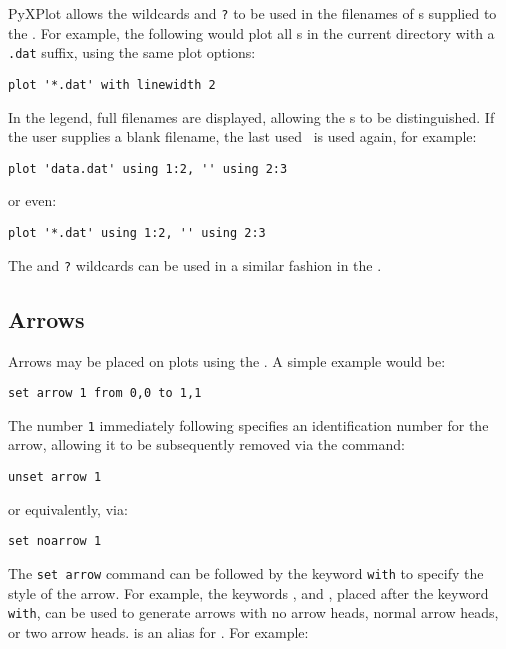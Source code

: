 PyXPlot allows the wildcards {\tt *} and {\tt ?} to be used in the filenames of
\datafile s supplied to the .  For example, the following would
plot all \datafile s in the current directory with a {\tt .dat} suffix, using
the same plot options:

\begin{verbatim}
plot '*.dat' with linewidth 2
\end{verbatim}

\noindent In the legend, full filenames are displayed, allowing the \datafile s
to be distinguished. If the user supplies a blank filename, the last used
\datafile\ is used again, for example:

\begin{verbatim}
plot 'data.dat' using 1:2, '' using 2:3
\end{verbatim}

\noindent or even:

\begin{verbatim}
plot '*.dat' using 1:2, '' using 2:3
\end{verbatim}

The {\tt *} and {\tt ?} wildcards can be used in a similar fashion in the
.

\subsection{Arrows}

\label{set_arrow} Arrows may be placed on plots using the
. A simple example would be:

\begin{verbatim}
set arrow 1 from 0,0 to 1,1
\end{verbatim}

\noindent The number {\tt 1} immediately following 
specifies an identification number for the arrow, allowing it to be
subsequently removed via the command:

\begin{verbatim}
unset arrow 1
\end{verbatim}

\noindent or equivalently, via:

\begin{verbatim}
set noarrow 1
\end{verbatim}

The {\tt set arrow} command can be followed by the keyword {\tt with} to
specify the style of the arrow. For example, the keywords ,
 and , placed after the keyword {\tt with}, can
be used to generate arrows with no arrow heads, normal arrow heads, or two
arrow heads.   is an alias for .  For example:

